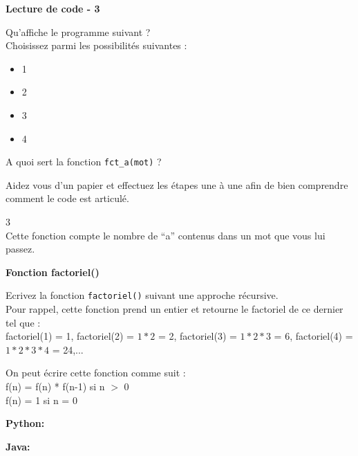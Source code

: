 	\begin{Exercice}[5 minutes] \textbf{Lecture de code - 3 \optionnel} 
	
	Qu'affiche le programme suivant ? \\ 
	
	  
	
	Choisissez parmi les possibilités suivantes :
	
	\begin{itemize}
	\item 1
	\item 2
	\item 3
	\item 4
	\end{itemize}
	
	A quoi sert la fonction \lstinline{fct_a(mot)} ? \\
	
		\begin{conseil} 
		Aidez vous d'un papier et effectuez les étapes une à une afin de bien comprendre comment le code est articulé.
		\end{conseil} 
	
		\begin{solution} 
		3 \\
		
		Cette fonction compte le nombre de ``a'' contenus dans un mot que vous lui passez.
	
		\end{solution} 
	
	\end{Exercice}
	
	\begin{Exercice}[10 minutes] \textbf{Fonction factoriel()} 
	
	Ecrivez la fonction \lstinline{factoriel()} suivant une approche récursive. \\ 
	
	Pour rappel, cette fonction prend un entier et retourne le factoriel de ce dernier tel que : \\
	
	factoriel(1) = 1, factoriel(2) = $1*2$ = 2, factoriel(3) = $1*2*3$ = 6, factoriel(4) = $1*2*3*4$ = 24,...
	  
	
		\begin{conseil} 
		On peut écrire cette fonction comme suit : \\
		
		f(n) = f(n) * f(n-1) si n $>$ 0 \\
		
		f(n) = 1 si n = 0
		
		\end{conseil} 
	
        \begin{solution} 
            \textbf{Python:}
            
            \textbf{Java:}
            
		\end{solution} 
	
	\end{Exercice}
	
